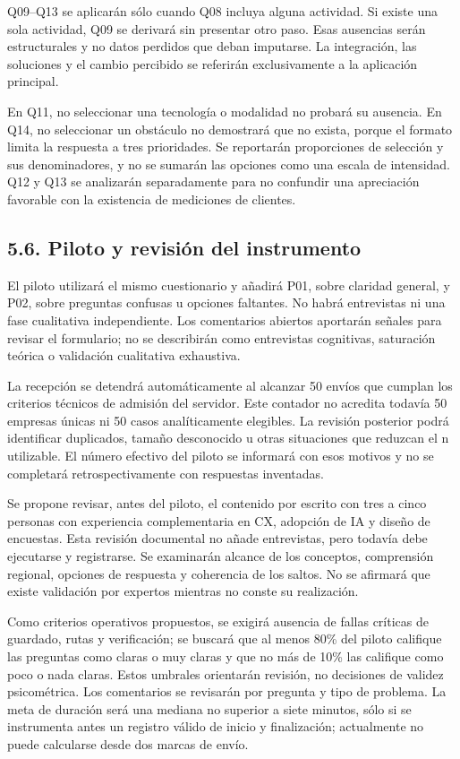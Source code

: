 \documentclass[12pt,letterpaper]{article}
\begin{document}
Q09--Q13 se aplicarán sólo cuando Q08 incluya alguna actividad. Si existe una sola actividad, Q09 se derivará sin presentar otro paso. Esas ausencias serán estructurales y no datos perdidos que deban imputarse. La integración, las soluciones y el cambio percibido se referirán exclusivamente a la aplicación principal.

En Q11, no seleccionar una tecnología o modalidad no probará su ausencia. En Q14, no seleccionar un obstáculo no demostrará que no exista, porque el formato limita la respuesta a tres prioridades. Se reportarán proporciones de selección y sus denominadores, y no se sumarán las opciones como una escala de intensidad. Q12 y Q13 se analizarán separadamente para no confundir una apreciación favorable con la existencia de mediciones de clientes.

\subsection*{5.6. Piloto y revisión del instrumento}
El piloto utilizará el mismo cuestionario y añadirá P01, sobre claridad general, y P02, sobre preguntas confusas u opciones faltantes. No habrá entrevistas ni una fase cualitativa independiente. Los comentarios abiertos aportarán señales para revisar el formulario; no se describirán como entrevistas cognitivas, saturación teórica o validación cualitativa exhaustiva.

La recepción se detendrá automáticamente al alcanzar 50 envíos que cumplan los criterios técnicos de admisión del servidor. Este contador no acredita todavía 50 empresas únicas ni 50 casos analíticamente elegibles. La revisión posterior podrá identificar duplicados, tamaño desconocido u otras situaciones que reduzcan el n utilizable. El número efectivo del piloto se informará con esos motivos y no se completará retrospectivamente con respuestas inventadas.

Se propone revisar, antes del piloto, el contenido por escrito con tres a cinco personas con experiencia complementaria en CX, adopción de IA y diseño de encuestas. Esta revisión documental no añade entrevistas, pero todavía debe ejecutarse y registrarse. Se examinarán alcance de los conceptos, comprensión regional, opciones de respuesta y coherencia de los saltos. No se afirmará que existe validación por expertos mientras no conste su realización.

Como criterios operativos propuestos, se exigirá ausencia de fallas críticas de guardado, rutas y verificación; se buscará que al menos 80\% del piloto califique las preguntas como claras o muy claras y que no más de 10\% las califique como poco o nada claras. Estos umbrales orientarán revisión, no decisiones de validez psicométrica. Los comentarios se revisarán por pregunta y tipo de problema. La meta de duración será una mediana no superior a siete minutos, sólo si se instrumenta antes un registro válido de inicio y finalización; actualmente no puede calcularse desde dos marcas de envío.
\end{document}
